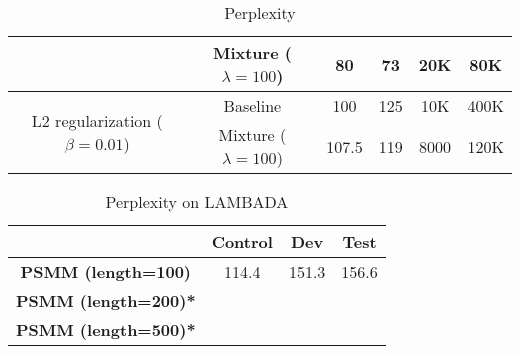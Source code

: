 \begin{table}[]
\begin{tabular}{cc|c|c|c|c|}
		\multicolumn{1}{|c|}{}                                                  & Mixture ($\lambda=100$) & 80          & 73         & 20K          & 80K         \\ \hline
		\multicolumn{1}{|c|}{\multirow{2}{*}{L2 regularization ($\beta=0.01$)}} & Baseline                & 100         & 125        & 10K          & 400K        \\ \cline{2-6} 
		\multicolumn{1}{|c|}{}                                                  & Mixture ($\lambda=100$) & 107.5       & 119        & 8000         & 120K        \\ \hline
	\end{tabular}
	\caption{Perplexity}
	\label{smmExps}
\end{table}


\begin{table}[]
	\centering
	\begin{tabular}{c|c|c|c|}
		\cline{2-4}
		\multicolumn{1}{l|}{}                             & \textbf{Control} & \textbf{Dev} & \textbf{Test} \\ \hline
		\multicolumn{1}{|c|}{\textbf{PSMM (length=100)}}  & 114.4            & 151.3        & 156.6         \\ \hline
		\multicolumn{1}{|c|}{\textbf{PSMM (length=200)*}} &                  &              &               \\ \hline
		\multicolumn{1}{|c|}{\textbf{PSMM (length=500)*}} &                  &              &               \\ \hline
	\end{tabular}
	\caption{Perplexity on LAMBADA}
	\label{psmmExps}
\end{table}